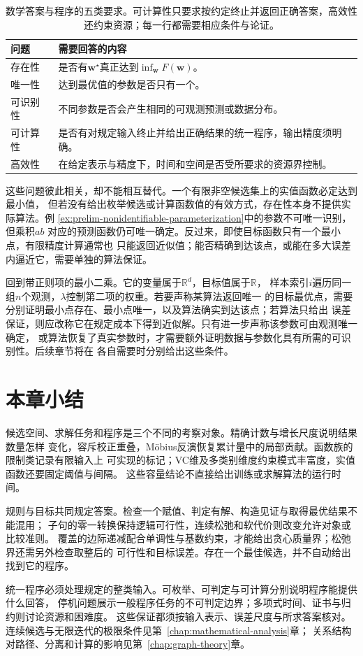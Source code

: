 \begin{table}[htbp]
  \centering
  \small
  \begin{tabularx}{\linewidth}{@{}lX@{}}
    \toprule
    \textbf{问题} & \textbf{需要回答的内容} \\
    \midrule
    存在性 & 是否有$\bm{w}^\star$真正达到$\inf_{\bm{w}}F(\bm{w})$。 \\
    唯一性 & 达到最优值的参数是否只有一个。 \\
    可识别性 & 不同参数是否会产生相同的可观测预测或数据分布。 \\
    可计算性 & 是否有对规定输入终止并给出正确结果的统一程序，输出精度须明确。 \\
    高效性 & 在给定表示与精度下，时间和空间是否受所要求的资源界控制。 \\
    \bottomrule
  \end{tabularx}
  \caption{数学答案与程序的五类要求。可计算性只要求按约定终止并返回正确答案，高效性还约束资源；每一行都需要相应条件与论证。}
  \label{tab:prelim-four-solution-questions}
\end{table}

这些问题彼此相关，却不能相互替代。一个有限非空候选集上的实值函数必定达到最小值，
但若没有给出枚举候选或计算函数值的有效方式，存在性本身不提供实际算法。例
\ref{ex:prelim-nonidentifiable-parameterization}中的参数不可唯一识别，但乘积$ab$
对应的预测函数仍可唯一确定。反过来，即使目标函数只有一个最小点，有限精度计算通常也
只能返回近似值；能否精确到达该点，或能在多大误差内逼近它，需要单独的算法保证。

回到带正则项的最小二乘。它的变量属于$\mathbb{R}^d$，目标值属于$\mathbb{R}$，
样本索引$i$遍历同一组$n$个观测，$\lambda$控制第二项的权重。若要声称某算法返回唯一
的目标最优点，需要分别证明最小点存在、最小点唯一，以及算法确实到达该点；若算法只给出
误差保证，则应改称它在规定成本下得到近似解。只有进一步声称该参数可由观测唯一确定，
或算法恢复了真实参数时，才需要额外证明数据与参数化具有所需的可识别性。后续章节将在
各自需要时分别给出这些条件。

\section{本章小结}
\label{sec:comb-summary}

候选空间、求解任务和程序是三个不同的考察对象。精确计数与增长尺度说明结果数量怎样
变化，容斥校正重叠，Möbius反演恢复累计量中的局部贡献。函数族的限制类记录有限输入上
可实现的标记；VC维及多类别维度约束模式丰富度，实值函数还要固定阈值与间隔。
这些容量结论不直接给出训练或求解算法的运行时间。

规则与目标共同规定答案。检查一个赋值、判定有解、构造见证与取得最优结果不能混用；
子句的零一转换保持逻辑可行性，连续松弛和软代价则改变允许对象或比较准则。
覆盖的边际递减配合单调性与基数约束，才能给出贪心质量界；松弛界还需另外检查取整后的
可行性和目标误差。存在一个最佳候选，并不自动给出找到它的程序。

统一程序必须处理规定的整类输入。可枚举、可判定与可计算分别说明程序能提供什么回答，
停机问题展示一般程序任务的不可判定边界；多项式时间、证书与归约则讨论资源和困难度。
这些保证都须按输入表示、误差尺度与所求答案核对。
连续候选与无限迭代的极限条件见第~\ref{chap:mathematical-analysis}章；
关系结构对路径、分离和计算的影响见第~\ref{chap:graph-theory}章。

